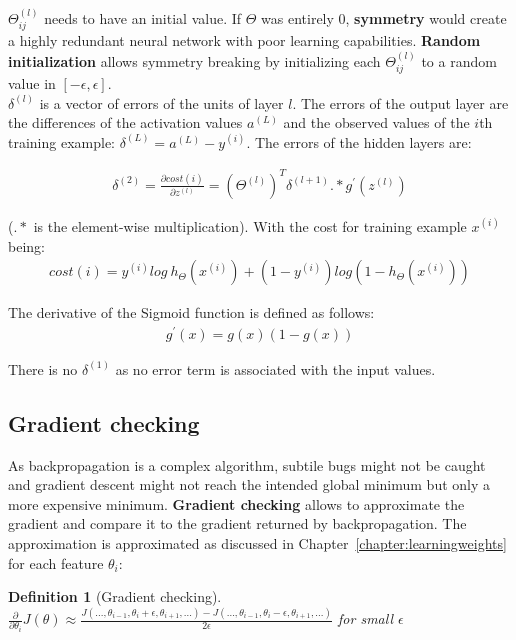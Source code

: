\documentclass{report}
\newtheorem{definition}{Definition}[section]
\begin{document}
$\Theta_{ij}^{(l)}$ needs to have an initial value. If $\Theta$ was entirely 0, {\bf symmetry} would create a highly redundant neural network with poor learning capabilities.
{\bf Random initialization} allows symmetry breaking by initializing each $\Theta_{ij}^{(l)}$ to a random value in $[-\epsilon,\epsilon]$. \\

$\delta^{(l)}$ is a vector of errors of the units of layer $l$.
The errors of the output layer are the differences of the activation values $a^{(L)}$ and the observed values of the $i$th training example: $\delta^{(L)}=a^{(L)}-y^{(i)}$.
The errors of the hidden layers are: 

\begin{align*}
\delta^{(2)} = \frac{\partial cost(i)}{\partial z^{(l)}} =(\Theta^{(l)})^T\delta^{(l+1)}.*g^{'}(z^{(l)})
\end{align*}

($.*$ is the element-wise multiplication). With the cost for training example $x^{(i)}$ being:
\begin{align*}
cost(i) = y^{(i)}log\:h_{\Theta}(x^{(i)})+(1-y^{(i)})log(1-h_{\Theta}(x^{(i)}))
\end{align*}

The derivative of the Sigmoid function is defined as follows:
\begin{align*}
g^{'}(x)=g(x)(1-g(x))
\end{align*}

There is no $\delta^{(1)}$ as no error term is associated with the input values.


\subsection{Gradient checking}
As backpropagation is a complex algorithm, subtile bugs might not be caught and gradient descent might not reach the intended global minimum but only a more expensive minimum.
{\bf Gradient checking} allows to approximate the gradient and compare it to the gradient returned by backpropagation.
The approximation is approximated as discussed in Chapter~\ref{chapter:learningweights} for each feature $\theta_i$:
\begin{definition}[Gradient checking] ~\\
$\frac{\partial}{\partial\theta_i}J(\theta)\approx\frac{J(...,\theta_{i-1},\theta_{i}+\epsilon,\theta_{i+1},...)-J(...,\theta_{i-1},\theta_{i}-\epsilon,\theta_{i+1},...)}{2\epsilon}$ for small $\epsilon$
\end{definition}
\end{document}
